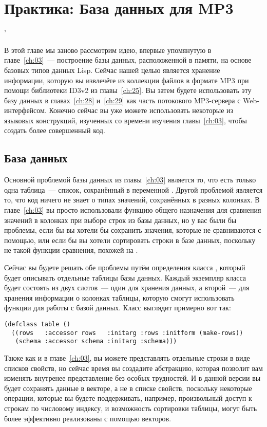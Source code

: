 \chapter{Практика: База данных для MP3}
'\label{ch:27}

В этой главе мы заново рассмотрим идею, впервые упомянутую в главе~\ref{ch:03}~---
построение базы данных, расположенной в памяти, на основе базовых типов данных Lisp.
Сейчас нашей целью является хранение информации, которую вы извлечёте из коллекции файлов
в формате MP3 при помощи библиотеки ID3v2 из главы~\ref{ch:25}.  Вы затем будете
использовать эту базу данных в главах~\ref{ch:28} и~\ref{ch:29} как часть потокового
MP3-сервера с Web-интерфейсом.  Конечно сейчас вы уже можете использовать некоторые из
языковых конструкций, изученных со времени изучения главы~\ref{ch:03}, чтобы создать более
совершенный код.

\section{База данных}

Основной проблемой базы данных из главы~\ref{ch:03} является то, что есть только одна
таблица~--- список, сохранённый в переменной .  Другой проблемой является то,
что код ничего не знает о типах значений, сохранённых в разных колонках.  В
главе~\ref{ch:03} вы просто использовали функцию общего назначения  для
сравнения значений в колонках при выборе строк из базы данных, но у вас были бы проблемы,
если бы вы хотели бы сохранить значения, которые не сравниваются с помощью,
или если бы вы хотели сортировать строки в базе данных, поскольку не такой функции
сравнения, похожей на .

Сейчас вы будете решать обе проблемы путём определения класса , который будет
описывать отдельные таблицы базы данных.  Каждый экземпляр класса  будет
состоять из двух слотов~--- один для хранения данных, а второй~--- для хранения информации о
колонках таблицы, которую смогут использовать функции для работы с базой данных.  Класс
выглядит примерно вот так:

\begin{lstlisting}
(defclass table ()
  ((rows   :accessor rows   :initarg :rows :initform (make-rows))
   (schema :accessor schema :initarg :schema)))
\end{lstlisting}

Также как и в главе~\ref{ch:03}, вы можете представлять отдельные строки в виде списков
свойств, но сейчас время вы создадите абстракцию, которая позволит вам изменять внутренее
представление без особых трудностей. И в данной версии вы будет сохранять данные в
векторе, а не в списке свойств, поскольку некоторые операции, которые вы будете
поддерживать, например, произвольный доступ к строкам по числовому индексу, и возможность
сортировки таблицы, могут быть более эффективно реализованы с помощью векторов.

